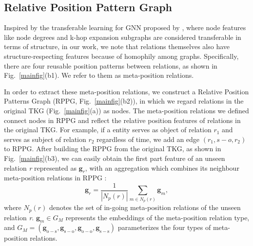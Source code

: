 \documentclass[sigconf]{acmart}
\begin{document}
\subsection{Relative Position Pattern Graph}
\par
Inspired by the transferable learning for GNN proposed by \citep{transferGNN}, where node features like node degrees and k-hop expansion subgraphs are considered transferable in terms of structure, in our work, we note that relations themselves also have structure-respecting features because of homophily among graphs. Specifically, there are four reusable position patterns between relations, as shown in Fig.~\ref{mainfig}(b1). We refer to them as meta-position relations.
\par
In order to extract these meta-position relations, we construct a Relative Position Patterns Graph (RPPG, Fig.~\ref{mainfig}(b2)), in which we regard relations in the original TKG (Fig.~\ref{mainfig}(a)) as nodes. The meta-position relations we defined connect nodes in RPPG and reflect the relative position features of relations in the original TKG. For example, if a entity serves as object of relation $r_{1} $ and serves as subject of relation $r_{2} $ regardless of time, we add an edge $\left(r_{1}, s-o, r_{2}\right)$ to RPPG. After building the RPPG from the original TKG, as shown in Fig.~\ref{mainfig}(b3), we can easily obtain the first part feature of an unseen relation \emph{r} represented as $\mathbf{g}_{r}$, with an aggregation which combines its neighbour meta-position relations in RPPG :
\begin{equation}
\mathbf{g}_{r}=\frac{1}{| {N}_{p}(r)|} \sum_{m \in  {N}_{p}(r)} \mathbf{g}_{m},
\end{equation}
where  $ {N}_{p}(r)$ denotes the set of in-going meta-position relations of the unseen relation \emph{r}. $\mathbf{g}_{m} \in  {G}_{M}$  represents the embeddings of the meta-position relation type, and $ {G}_{M}=\left(\mathbf{g}_{\mathrm{o}-\mathrm{s}}, \mathbf{g}_{\mathrm{s}-\mathrm{o}}, \mathbf{g}_{\mathrm{o}-\mathrm{o}}, \mathbf{g}_{\mathrm{s}-\mathrm{s}}\right)$ parameterizes the four types of meta-position relations.
\end{document}
